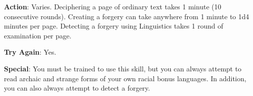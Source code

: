 \textbf{Action}: Varies. Deciphering a page of ordinary text takes 1 minute (10 consecutive rounds). Creating a forgery can take anywhere from 1 minute to 1d4 minutes per page. Detecting a forgery using Linguistics takes 1 round of examination per page.
				
\textbf{Try Again}: Yes.
				
\textbf{Special}: You must be trained to use this skill, but you can always attempt to read archaic and strange forms of your own racial bonus languages. In addition, you can also always attempt to detect a forgery.
        	
